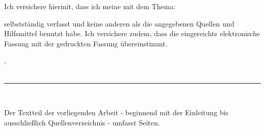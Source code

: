 \noindent Ich versichere hiermit, dass ich meine \thesistyp{} mit dem Thema:
\begin{center}
\textbf{ \thesistitel}
\end{center}

\noindent selbstständig verfasst und keine anderen als die angegebenen Quellen und Hilfsmittel benutzt habe. Ich versichere zudem, dass die 				  eingereichte elektronische Fassung mit der gedruckten Fassung übereinstimmt.

\vspace*{1cm}
\noindent \orterklaerung, \datumerklaerung{} \\
\vspace*{1.5cm} \\
\noindent\rule{8cm}{0.5pt}\\
\thesisauthor
\vfill*


\noindent Der Textteil der vorliegenden Arbeit - beginnend mit der Einleitung bis ausschließlich Quellenverzeichnis - umfasst \pageref{seitenreinschrifft} Seiten.


